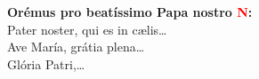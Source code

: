 \textbf{Orémus pro beatíssimo Papa nostro \textcolor{red}{N}:}\\
Pater noster, qui es in c{\ae}lis\ldots\\
Ave María, grátia plena\ldots\\
Glória Patri,\ldots
